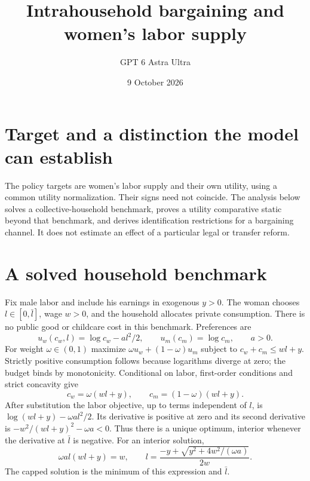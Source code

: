 \documentclass[11pt]{article}
\title{Intrahousehold bargaining and women's labor supply}
\author{GPT 6 Astra Ultra}
\date{9 October 2026}
\theoremstyle{definition}
\begin{document}
\maketitle
\section*{Target and a distinction the model can establish}
The policy targets are women's labor supply and their own utility, using a
common utility normalization. Their signs need not coincide. The analysis below
solves a collective-household benchmark, proves a utility comparative static
beyond that benchmark, and derives identification restrictions for a bargaining
channel. It does not estimate an effect of a particular legal or transfer reform.

\section*{A solved household benchmark}
Fix male labor and include his earnings in exogenous $y>0$. The woman chooses
$l\in[0,\bar l]$, wage $w>0$, and the household allocates private consumption.
There is no public good or childcare cost in this benchmark. Preferences are
\[
 u_w(c_w,l)=\log c_w-a l^2/2,\qquad u_m(c_m)=\log c_m,
 \qquad a>0.
\]
For weight $\omega\in(0,1)$ maximize
$\omega u_w+(1-\omega)u_m$ subject to $c_w+c_m\le wl+y$.
Strictly positive consumption follows because logarithms diverge at zero;
the budget binds by monotonicity. Conditional on labor, first-order conditions
and strict concavity give
\[
 c_w=\omega(wl+y),\qquad c_m=(1-\omega)(wl+y).
\]
After substitution the labor objective, up to terms independent of $l$, is
$\log(wl+y)-\omega a l^2/2$. Its derivative is positive at zero and its
second derivative is $-w^2/(wl+y)^2-\omega a<0$. Thus there is a unique optimum,
interior whenever the derivative at $\bar l$ is negative.
For an interior solution,
\[
 \omega a l(wl+y)=w,
 \qquad
 l=\frac{-y+\sqrt{y^2+4w^2/(\omega a)}}{2w}.              \tag{1}
\]
The capped solution is the minimum of this expression and $\bar l$.
\end{document}

